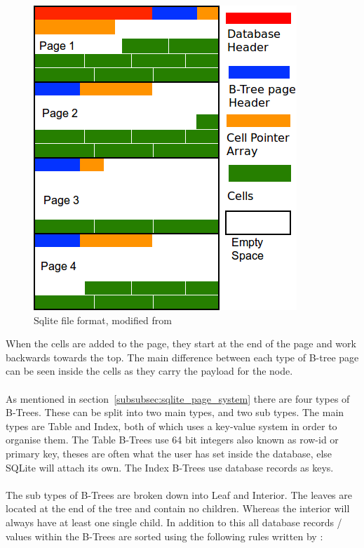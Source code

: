 \begin{figure}[H]
	\centering
	\includegraphics[scale=0.5]{images/sqlite_file_format.png}
	\caption{Sqlite file format, modified from \cite{sausagefactory}}
	\label{fig:sqlite_file_format}
\end{figure}

When the cells are added to the page, they start at the end of the page and work backwards towards the top. The main difference between each type of B-tree page can be seen inside the cells as they carry the payload for the node. 
\\\\
As mentioned in section~\ref{subsubsec:sqlite_page_system} there are four types of B-Trees. These can be split into two main types, and two sub types. The main types are Table and Index, both of which uses a key-value system in order to organise them. The Table B-Trees use 64 bit integers also known as row-id or primary key, theses are often what the user has set inside the database, else SQLite will attach its own. The Index B-Trees use database records as keys. 
\\\\
The sub types of B-Trees are broken down into Leaf and Interior. The leaves are located at the end of the tree and contain no children. Whereas the interior will always have at least one single child. In addition to this all database records / values within the B-Trees are sorted using the following rules written by \cite{sqliteray}:

